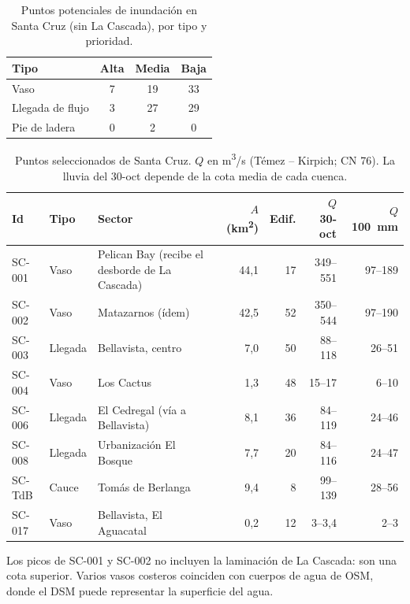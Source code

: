 \documentclass{sosg-informe}
\newcommand{\kmc}{km\textsuperscript{2}}
\newcommand{\mcs}{m\textsuperscript{3}/s}
\begin{document}
\begin{table}[ht]
  \centering\small
  \caption{Puntos potenciales de inundación en Santa Cruz (sin La Cascada), por tipo y prioridad.}
  \label{tab:puntos}
  \begin{tabular}{lccc}
    \toprule
    Tipo & Alta & Media & Baja \\
    \midrule
    Vaso & 7 & 19 & 33 \\
    Llegada de flujo & 3 & 27 & 29 \\
    Pie de ladera & 0 & 2 & 0 \\
    \bottomrule
  \end{tabular}
\end{table}

\begin{table}[ht]
  \centering\small
  \caption{Puntos seleccionados de Santa Cruz. $Q$ en \mcs{} (Témez -- Kirpich; CN 76). La lluvia del 30-oct depende de la cota media de cada cuenca.}
  \label{tab:topsc}
  \begin{tabularx}{\linewidth}{ll>{\raggedright\arraybackslash}Xrrrr}
    \toprule
    Id & Tipo & Sector & $A$ (\kmc) & Edif. & $Q$ 30-oct & $Q$ 100~mm \\
    \midrule
    SC-001 & Vaso & Pelican Bay (recibe el desborde de La Cascada) & 44,1 & 17 & 349--551 & 97--189 \\
    SC-002 & Vaso & Matazarnos (ídem) & 42,5 & 52 & 350--544 & 97--190 \\
    SC-003 & Llegada & Bellavista, centro & 7,0 & 50 & 88--118 & 26--51 \\
    SC-004 & Vaso & Los Cactus & 1,3 & 48 & 15--17 & 6--10 \\
    SC-006 & Llegada & El Cedregal (vía a Bellavista) & 8,1 & 36 & 84--119 & 24--46 \\
    SC-008 & Llegada & Urbanización El Bosque & 7,7 & 20 & 84--116 & 24--47 \\
    SC-TdB & Cauce & Tomás de Berlanga & 9,4 & 8 & 99--139 & 28--56 \\
    SC-017 & Vaso & Bellavista, El Aguacatal & 0,2 & 12 & 3--3,4 & 2--3 \\
    \bottomrule
  \end{tabularx}
  \par\vspace{3pt}\raggedright\footnotesize Los picos de SC-001 y SC-002 no incluyen la laminación de La Cascada: son una cota superior. Varios vasos costeros coinciden con cuerpos de agua de OSM, donde el DSM puede representar la superficie del agua.
\end{table}
\end{document}
